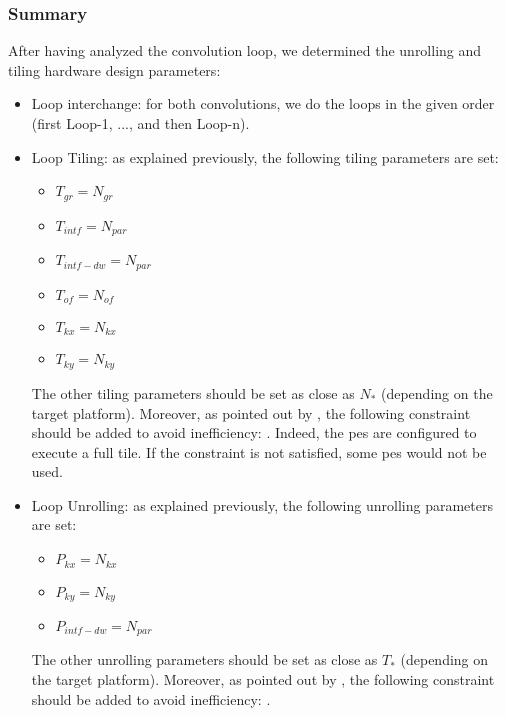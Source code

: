 \subsubsection{Summary}
%
After having analyzed the convolution loop, we determined the unrolling and tiling hardware design parameters:
\begin{itemize}
    \item Loop interchange: for both convolutions, we do the loops in the given order (first Loop-1, ..., and then Loop-n).
    \item Loop Tiling: as explained previously, the following tiling parameters are set:
    \begin{itemize}
        \item $T_{gr} = N_{gr}$
        \item $T_{intf} = N_{par}$
        \item $T_{intf-dw} = N_{par}$
        \item $T_{of} = N_{of}$
        \item $T_{kx} = N_{kx}$
        \item $T_{ky} = N_{ky}$
    \end{itemize}
    The other tiling parameters should be set as close as $N_{*}$ (depending on the target platform). Moreover, as pointed out by \textcite{ma_optimizing_2018}, the following constraint should be added to avoid inefficiency: . Indeed, the \acrshort{pe}s are configured to execute a full tile. If the constraint is not satisfied, some \acrshort{pe}s would not be used.
    \item Loop Unrolling: as explained previously, the following unrolling parameters are set:
    \begin{itemize}
        \item $P_{kx} = N_{kx}$
        \item $P_{ky} = N_{ky}$
        \item $P_{intf-dw} = N_{par}$
    \end{itemize}
    The other unrolling parameters should be set as close as $T_{*}$ (depending on the target platform). Moreover, as pointed out by \textcite{ma_optimizing_2018}, the following constraint should be added to avoid inefficiency: .
\end{itemize}
